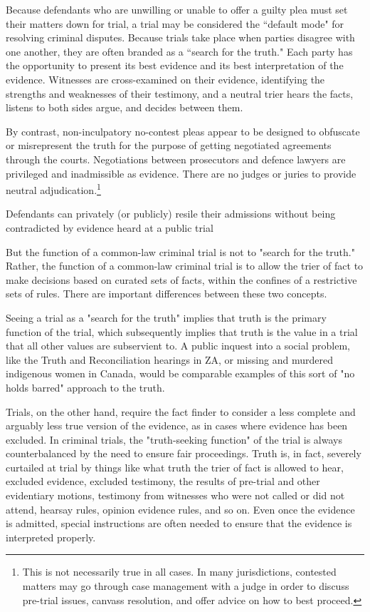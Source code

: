 Because defendants who are unwilling or unable to offer a guilty plea must set their matters down for trial, a trial may be considered the ``default mode" for resolving criminal disputes. Because trials take place when parties disagree with one another, they are often branded as a ``search for the truth." Each party has the opportunity to present its best evidence and its best interpretation of the evidence. Witnesses are cross-examined on their evidence, identifying the strengths and weaknesses of their testimony, and a neutral trier hears the facts, listens to both sides argue, and decides between them.

By contrast, non-inculpatory no-contest pleas appear to be designed to obfuscate or misrepresent the truth for the purpose of getting negotiated agreements through the courts. Negotiations between prosecutors and defence lawyers are privileged and inadmissible as evidence. There are no judges or juries to provide neutral adjudication.\footnote{This is not necessarily true in all cases. In many jurisdictions, contested matters may go through case management with a judge in order to discuss pre-trial issues, canvass resolution, and offer advice on how to best proceed. }

Defendants can privately (or publicly) resile their admissions without being contradicted by evidence heard at a public trial

But the function of a common-law criminal trial is not to "search for the truth." Rather, the function of a common-law criminal trial is to allow the trier of fact to make decisions based on curated sets of facts, within the confines of a restrictive sets of rules. There are important differences between these two concepts. 

Seeing a trial as a "search for the truth" implies that truth is the primary function of the trial, which subsequently implies that truth is the value in a trial that all other values are subservient to. A public inquest into a social problem, like the Truth and Reconciliation hearings in ZA, or missing and murdered indigenous women in Canada, would be comparable examples of this sort of "no holds barred" approach to the truth. 

Trials, on the other hand, require the fact finder to consider a less complete and arguably less true version of the evidence, as in cases where evidence has been excluded. In criminal trials, the "truth-seeking function" of the trial is always counterbalanced by the need to ensure fair proceedings. Truth is, in fact, severely curtailed at trial by things like what truth the trier of fact is allowed to hear, excluded evidence, excluded testimony, the results of pre-trial and other evidentiary motions, testimony from witnesses who were not called or did not attend, hearsay rules, opinion evidence rules, and so on. Even once the evidence is admitted, special instructions are often needed to ensure that the evidence is interpreted properly. 

